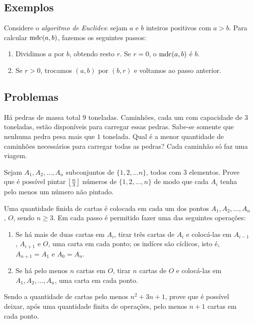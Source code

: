 \documentclass[10pt,a4paper]{article}
\begin{document}
	\subsection*{Exemplos}

	\begin{exmp}
		Considere o \emph{algoritmo de Euclides}: sejam $a$ e $b$ inteiros positivos com $a > b$. Para calcular $\operatorname{mdc}(a, b)$, fazemos os seguintes passos:
		\begin{enumerate}
			\item Dividimos $a$ por $b$, obtendo resto $r$. Se $r = 0$, o $\operatorname{mdc}(a, b)$ é $b$.
			\item Se $r > 0$, trocamos $(a, b)$ por $(b, r)$ e voltamos ao passo anterior.
		\end{enumerate}
	\end{exmp}

	\subsection*{Problemas}
	\begin{prob}
		Há pedras de massa total $9$ toneladas. Caminhões, cada um com capacidade de $3$ toneladas, estão disponíveis para carregar essas pedras. Sabe-se somente que nenhuma pedra pesa mais que $1$ tonelada. Qual é a menor quantidade de caminhões necessários para carregar todas as pedras? Cada caminhão só faz uma viagem.
	\end{prob}

	\begin{prob}
		Sejam $A_1, A_2, \dots, A_n$ subconjuntos de $\{1, 2, \dots n\}$, todos com $3$ elementos. Prove que é possível pintar $\left \lfloor{\frac{n}{3}}\right \rfloor$ números de $\{1, 2, \dots, n\}$ de modo que cada $A_i$ tenha pelo menos um número não pintado.
	\end{prob}	

	\begin{prob}
		Uma quantidade finida de cartas é colocada em cada um dos pontos $A_1, A_2, \dots, A_n$, $O$, sendo $n \ge 3$. Em cada passo é permitido fazer uma das seguintes operações:
		
		\begin{enumerate}[label = (\roman*)]
			\item Se há mais de duas cartas em $A_i$, tirar três cartas de $A_i$ e colocá-las em $A_{i-1}$, $A_{i+1}$ e $O$, uma carta em cada ponto; os indíces são cíclicos, isto é, $A_{n+1} = A_1$ e $A_0 = A_n$.
			\item Se há pelo menos $n$ cartas em $O$, tirar $n$ cartas de $O$ e colocá-las em $A_1, A_2, \dots, A_n$, uma carta em cada ponto.
		\end{enumerate}	

		Sendo a quantidade de cartas pelo menos $n^2 + 3n + 1$, prove que é possível deixar, após uma quantidade finita de operações, pelo menos $n+1$ cartas em cada ponto.
	\end{prob}
\end{document}

